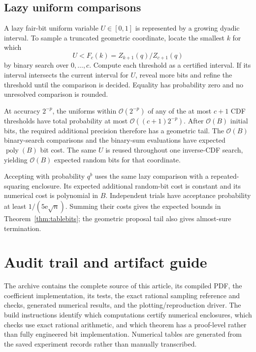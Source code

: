 \documentclass[11pt,a4paper]{article}
\theoremstyle{definition}
\newcommand{\ee}{\mathrm e}
\newcommand{\BigO}{\mathcal O}
\begin{document}
\subsection{Lazy uniform comparisons}

A lazy fair-bit uniform variable $U\in[0,1]$ is represented by a growing dyadic interval. To sample a truncated geometric coordinate, locate the smallest $k$ for which
\[
 U<F_c(k)=Z_{k+1}(q)/Z_{c+1}(q)
\]
by binary search over $0,\ldots,c$. Compute each threshold as a certified interval. If its interval intersects the current interval for $U$, reveal more bits and refine the threshold until the comparison is decided. Equality has probability zero and no unresolved comparison is rounded.

At accuracy $2^{-p}$, the uniforms within $\BigO(2^{-p})$ of any of the at most $c+1$ CDF thresholds have total probability at most $\BigO((c+1)2^{-p})$. After $\BigO(B)$ initial bits, the required additional precision therefore has a geometric tail. The $\BigO(B)$ binary-search comparisons and the binary-sum evaluations have expected $\operatorname{poly}(B)$ bit cost. The same $U$ is reused throughout one inverse-CDF search, yielding $\BigO(B)$ expected random bits for that coordinate.

Accepting with probability $q^b$ uses the same lazy comparison with a repeated-squaring enclosure. Its expected additional random-bit cost is constant and its numerical cost is polynomial in $B$. Independent trials have acceptance probability at least $1/(5\ee\sqrt n)$. Summing their costs gives the expected bounds in Theorem~\ref{thm:tablebits}; the geometric proposal tail also gives almost-sure termination.

\section{Audit trail and artifact guide}\label{app:artifacts}

The archive contains the complete source of this article, its compiled PDF, the coefficient implementation, its tests, the exact rational sampling reference and checks, generated numerical results, and the plotting/reproduction driver. The build instructions identify which computations certify numerical enclosures, which checks use exact rational arithmetic, and which theorem has a proof-level rather than fully engineered bit implementation. Numerical tables are generated from the saved experiment records rather than manually transcribed.
\end{document}
